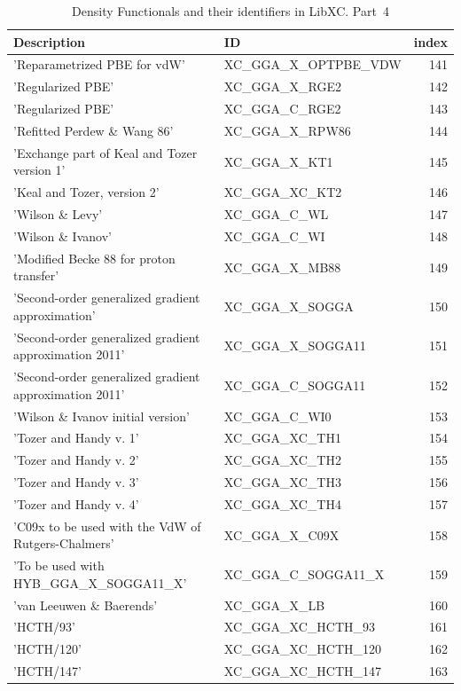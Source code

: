 \documentclass[final,12pt,makeidx,DIV=calc]{article}
\begin{document}
{{{\begin{table}[!h]
\caption{Density Functionals and their identifiers in LibXC. Part~4}
\begin{center}
\begin{tabular}{llr}
\hline
\hline
Description & ID & index\\
\hline
  'Reparametrized PBE for vdW' & XC\_GGA\_X\_OPTPBE\_VDW  &141\\
  'Regularized PBE' & XC\_GGA\_X\_RGE2  &142\\
  'Regularized PBE' & XC\_GGA\_C\_RGE2  &143\\
  'Refitted Perdew \& Wang 86' & XC\_GGA\_X\_RPW86  &144\\
  'Exchange part of Keal and Tozer version 1' & XC\_GGA\_X\_KT1  &145\\
  'Keal and Tozer, version 2' & XC\_GGA\_XC\_KT2  &146\\
  'Wilson \& Levy' & XC\_GGA\_C\_WL  &147\\
  'Wilson \& Ivanov' & XC\_GGA\_C\_WI  &148\\
  'Modified Becke 88 for proton transfer' & XC\_GGA\_X\_MB88  &149\\
  'Second-order generalized gradient approximation' & XC\_GGA\_X\_SOGGA  &150\\
  'Second-order generalized gradient approximation 2011' & XC\_GGA\_X\_SOGGA11  &151\\
  'Second-order generalized gradient approximation 2011' & XC\_GGA\_C\_SOGGA11  &152\\
  'Wilson \& Ivanov initial version' & XC\_GGA\_C\_WI0  &153\\
  'Tozer and Handy v. 1' & XC\_GGA\_XC\_TH1  &154\\
  'Tozer and Handy v. 2' & XC\_GGA\_XC\_TH2  &155\\
  'Tozer and Handy v. 3' & XC\_GGA\_XC\_TH3  &156\\
  'Tozer and Handy v. 4' & XC\_GGA\_XC\_TH4  &157\\
  'C09x to be used with the VdW of Rutgers-Chalmers' & XC\_GGA\_X\_C09X  &158\\
  'To be used with HYB\_GGA\_X\_SOGGA11\_X' & XC\_GGA\_C\_SOGGA11\_X  &159\\
  'van Leeuwen \& Baerends' & XC\_GGA\_X\_LB  &160\\
  'HCTH/93' & XC\_GGA\_XC\_HCTH\_93  &161\\
  'HCTH/120' & XC\_GGA\_XC\_HCTH\_120  &162\\
  'HCTH/147' & XC\_GGA\_XC\_HCTH\_147  &163\\

\end{tabular}
\end{center}
\end{table}}}}
\end{document}
